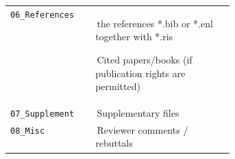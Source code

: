 {\begin{minipage}{\dimexpr\linewidth-2\fboxrule\relax}
\begin{tabularx}{\linewidth}{
				>{\raggedright\arraybackslash}p{0.38\linewidth}
				>{\raggedright\arraybackslash}X
			}
			\texttt{06\_References} &
			\,\tabitem the references *.bib or *.enl together with *.ris
			\par\smallskip
			\,\tabitem Cited papers/books (if publication rights are permitted) \\
			
			\texttt{07\_Supplement} &
			\,\tabitem Supplementary files \\
			
			\texttt{08\_Misc} &
			\,\tabitem Reviewer comments / rebuttals \\
			
		\end{tabularx}
		
	\end{minipage}%
}

\endgroup
